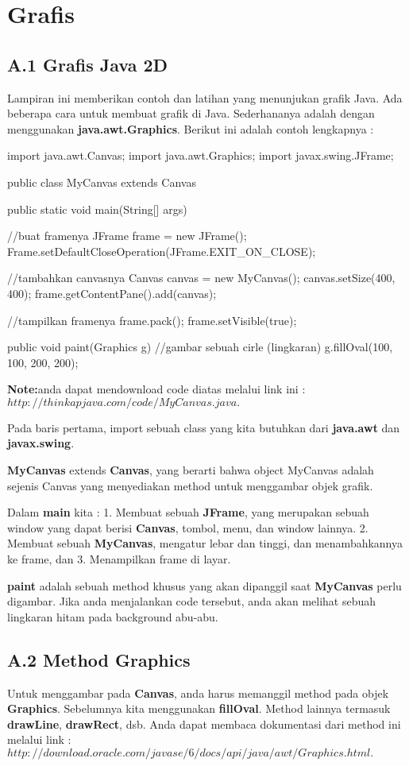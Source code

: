 \chapter{Grafis}
\section{A.1 Grafis Java 2D}
Lampiran ini memberikan contoh dan latihan yang menunjukan grafik Java. Ada beberapa cara untuk membuat grafik di Java. Sederhananya adalah dengan menggunakan \textbf{java.awt.Graphics}. Berikut ini adalah contoh lengkapnya :

\begin{list}
	import  java.awt.Canvas;
	import  java.awt.Graphics;
	import  javax.swing.JFrame;
	
	public class MyCanvas extends Canvas {
	public static void main(String[] args) {
	//buat framenya
	JFrame frame = new JFrame();
	Frame.setDefaultCloseOperation(JFrame.EXIT_ON_CLOSE);
	
	//tambahkan canvasnya
	Canvas canvas = new MyCanvas();
	canvas.setSize(400, 400);
	frame.getContentPane().add(canvas);
	
	//tampilkan framenya
	frame.pack();
	frame.setVisible(true);
	}
	
	public void paint(Graphics g) {
	//gambar sebuah cirle (lingkaran)
	g.fillOval(100, 100, 200, 200);
	}
}
\end{list}

\textbf{Note:}anda dapat mendownload code diatas melalui link ini : $http://thinkapjava.com/code/MyCanvas.java.$

Pada baris pertama, import sebuah class yang kita butuhkan dari \textbf{java.awt} dan \textbf{javax.swing}.

\textbf{MyCanvas} extends \textbf{Canvas}, yang berarti bahwa object MyCanvas adalah sejenis Canvas yang menyediakan method untuk menggambar objek grafik.

Dalam \textbf{main} kita :
1.	Membuat sebuah \textbf{JFrame}, yang merupakan sebuah window yang dapat berisi \textbf{Canvas}, tombol, menu, dan window lainnya.
2.	Membuat sebuah \textbf{MyCanvas}, mengatur lebar dan tinggi, dan menambahkannya ke frame, dan
3.	Menampilkan frame di layar.

\textbf{paint} adalah sebuah method khusus yang akan dipanggil saat \textbf{MyCanvas} perlu digambar. Jika anda menjalankan code tersebut, anda akan melihat sebuah lingkaran hitam pada background abu-abu.

\section{A.2 Method Graphics}
Untuk menggambar pada \textbf{Canvas}, anda harus memanggil method pada objek \textbf{Graphics}. Sebelumnya kita menggunakan \textbf{fillOval}. Method lainnya termasuk \textbf{drawLine}, \textbf{drawRect}, dsb. Anda dapat membaca dokumentasi dari method ini melalui link : 
$http://download.oracle.com/javase/6/docs/api/java/awt/Graphics.html.$

